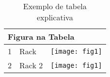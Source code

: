 \begin{table}[h!]
\centering
\caption{Exemplo de tabela explicativa}
\label{tab1}
\begin{tabular}{|l|l|l|}
\hline
\multicolumn{3}{|l|}{Figura na Tabela} \\ \hline
1        & Rack          & \texttt{[image: fig1]}        \\ \hline
2        & Rack 2        & \texttt{[image: fig1]}        \\ \hline
\end{tabular}
\end{table}